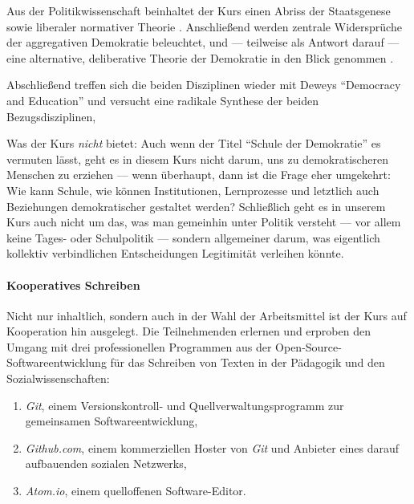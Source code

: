 Aus der Politikwissenschaft beinhaltet der Kurs einen Abriss der Staatsgenese \parencite{Tilly-1985-aa} sowie liberaler normativer Theorie \parencites{Dahl-1989-aa}.
Anschließend werden zentrale Widersprüche \parencite{Condorcet1785,Arrow1950} der aggregativen Demokratie beleuchtet, und --- teilweise als Antwort darauf --- eine alternative, deliberative Theorie der Demokratie in den Blick genommen \parencite{Cohen-1989-aa,Habermas1988a}.

Abschließend treffen sich die beiden Disziplinen wieder mit Deweys ``Democracy and Education'' \parencite{Dewey-1916} und versucht eine radikale Synthese der beiden Bezugsdisziplinen,

Was der Kurs \emph{nicht} bietet:
Auch wenn der Titel ``Schule der Demokratie'' es vermuten lässt, geht es in diesem Kurs nicht darum, uns zu demokratischeren Menschen zu erziehen --- wenn überhaupt, dann ist die Frage eher umgekehrt:
Wie kann Schule, wie können Institutionen, Lernprozesse und letztlich auch Beziehungen demokratischer gestaltet werden?
Schließlich geht es in unserem Kurs auch nicht um das, was man gemeinhin unter Politik versteht --- vor allem keine Tages- oder Schulpolitik --- sondern allgemeiner darum, was eigentlich kollektiv verbindlichen Entscheidungen Legitimität verleihen könnte.


\paragraph{Kooperatives Schreiben}
Nicht nur inhaltlich, sondern auch in der Wahl der Arbeitsmittel ist der Kurs auf Kooperation hin ausgelegt.
Die Teilnehmenden erlernen und erproben den Umgang mit drei professionellen Programmen aus der Open-Source-Softwareentwicklung für das Schreiben von Texten in der Pädagogik und den Sozialwissenschaften:

\begin{enumerate}
	\item \emph{Git}, einem Versionskontroll- und Quellverwaltungsprogramm zur gemeinsamen Softwareentwicklung,
	\item \emph{Github.com}, einem kommerziellen Hoster von \emph{Git} und Anbieter eines darauf aufbauenden sozialen Netzwerks,
	\item \emph{Atom.io}, einem quelloffenen Software-Editor.
\end{enumerate}